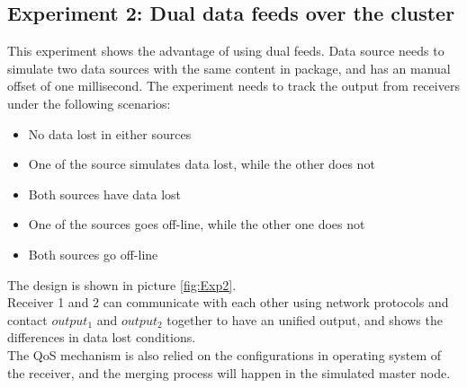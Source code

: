 \documentclass[11pt,openright,a4paper]{report}
\begin{document}
\subsection{Experiment 2: Dual data feeds over the cluster}
This experiment shows the advantage of using dual feeds. Data source needs to simulate two data sources with the same content in package, and has an manual offset of one millisecond. The experiment needs to track the output from receivers under the following scenarios:
\begin{itemize}
	\item No data lost in either sources
	\item One of the source simulates data lost, while the other does not
	\item Both sources have data lost
	\item One of the sources goes off-line, while the other one does not
	\item Both sources go off-line
\end{itemize}
The design is shown in picture \ref{fig:Exp2}.\\
Receiver 1 and 2 can communicate with each other using network protocols and contact $output_{1}$ and $output_{2}$ together to have an unified output, and shows the differences in data lost conditions.\\
The QoS mechanism is also relied on the configurations in operating system of the receiver, and the merging process will happen in the simulated master node.\\ 
\end{document}
